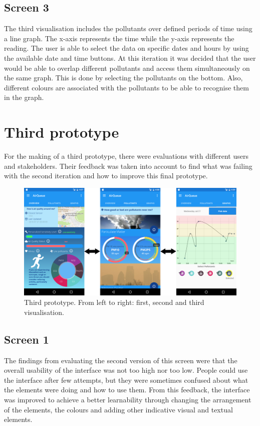 \subsection{Screen 3}
The third visualisation includes the pollutants over defined periods of time using a line graph. The x-axis represents the time while the y-axis represents the reading. The user is able to select the data on specific dates and hours by using the available date and time buttons. At this iteration it was decided that the user would be able to overlap different pollutants and access them simultaneously on the same graph. This is done by selecting the pollutants on the bottom. Also, different colours are associated with the pollutants to be able to recognise them in the graph.

\section{Third prototype}
For the making of a third prototype, there were evaluations with different users and stakeholders. Their feedback was taken into account to find what was failing with the second iteration and how to improve this final prototype. 

\begin{figure}[H]
\begin{adjustbox}{width=1.2\textwidth,center=\textwidth}
  \centering
  \includegraphics[scale=1]{images/thirdPrototype.png}
\end{adjustbox}
  \caption[Third prototype]{Third prototype. From left to right: first, second and third visualisation.}
  \label{fig:third_prototype}
\end{figure}

\subsection{Screen 1}
The findings from evaluating the second version of this screen were that the overall usability of the interface was not too high nor too low. People could use the interface after few attempts, but they were sometimes confused about what the elements were doing and how to use them. From this feedback, the interface was improved to achieve a better learnability through changing the arrangement of the elements, the colours and adding other indicative visual and textual elements.

